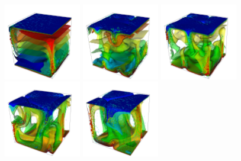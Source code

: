 \documentclass{article}
\begin{document}
\begin{figure}
  \centering
  \includegraphics[width=0.3\textwidth]{cookbooks/convection_box_3d/doc/movie0010.png}
  \hfill
  \includegraphics[width=0.3\textwidth]{cookbooks/convection_box_3d/doc/movie0040.png}
  \hfill
  \includegraphics[width=0.3\textwidth]{cookbooks/convection_box_3d/doc/movie0060.png}
  \\
  \includegraphics[width=0.3\textwidth]{cookbooks/convection_box_3d/doc/movie0100.png}
  \hfill
  \includegraphics[width=0.3\textwidth]{cookbooks/convection_box_3d/doc/movie0130.png}

\end{figure}
\end{document}
